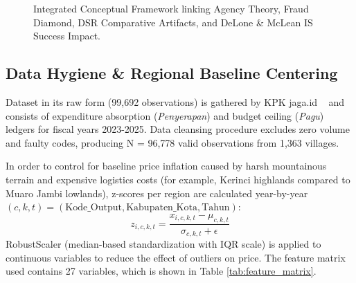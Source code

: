 \documentclass[conference]{IEEEtran}
\begin{document}
\begin{figure}[htbp]
\centering
{}

\caption{Integrated Conceptual Framework linking Agency Theory, Fraud Diamond, DSR Comparative Artifacts, and DeLone \& McLean IS Success Impact.}
\label{fig:conceptual_framework}
\end{figure}

\subsection{Data Hygiene \& Regional Baseline Centering}

Dataset in its raw form (99,692 observations) is gathered by KPK jaga.id ~\cite{ref26} and consists of expenditure absorption (\textit{Penyerapan}) and budget ceiling (\textit{Pagu}) ledgers for fiscal years 2023-2025. Data cleansing procedure excludes zero volume and faulty codes, producing N = 96,778 valid observations from 1,363 villages.

In order to control for baseline price inflation caused by harsh mountainous terrain and expensive logistics costs (for example, Kerinci highlands compared to Muaro Jambi lowlands), z-scores per region are calculated year-by-year 
$(c, k, t) = (\text{Kode\_Output}, \text{Kabupaten\_Kota}, \text{Tahun})$:
\begin{equation}
z_{i,c,k,t} = \frac{x_{i,c,k,t} - \mu_{c,k,t}}{\sigma_{c,k,t} + \epsilon}
\end{equation}
RobustScaler (median-based standardization with IQR scale) is applied to continuous variables to reduce the effect of outliers on price. The feature matrix used contains 27 variables, which is shown in Table \ref{tab:feature_matrix}.
\end{document}
